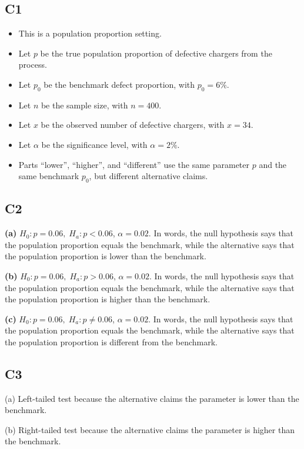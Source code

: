 \begin{ExamProblems}
		\subsection*{C1}
		\begin{itemize}
			\item This is a population proportion setting.
			\item Let \(p\) be the true population proportion of defective chargers from the process.
			\item Let \(p_0\) be the benchmark defect proportion, with \(p_0=6\%\).
			\item Let \(n\) be the sample size, with \(n=400\).
			\item Let \(x\) be the observed number of defective chargers, with \(x=34\).
			\item Let \(\alpha\) be the significance level, with \(\alpha=2\%\).
			\item Parts ``lower'', ``higher'', and ``different'' use the same parameter \(p\) and the same benchmark \(p_0\), but different alternative claims.
		\end{itemize}
		
		\subsection*{C2}
		\textbf{(a)} \(H_0\colon p=0.06,\; H_a\colon p<0.06\), \(\alpha=0.02\). In words, the null hypothesis says that the population proportion equals the benchmark, while the alternative says that the population proportion is lower than the benchmark.
		
		\textbf{(b)} \(H_0\colon p=0.06,\; H_a\colon p>0.06\), \(\alpha=0.02\). In words, the null hypothesis says that the population proportion equals the benchmark, while the alternative says that the population proportion is higher than the benchmark.
		
		\textbf{(c)} \(H_0\colon p=0.06,\; H_a\colon p\ne 0.06\), \(\alpha=0.02\). In words, the null hypothesis says that the population proportion equals the benchmark, while the alternative says that the population proportion is different from the benchmark.
		
		\subsection*{C3}
		(a) Left-tailed test because the alternative claims the parameter is lower than the benchmark.\LeftTailGraph
		
		(b) Right-tailed test because the alternative claims the parameter is higher than the benchmark.\RightTailGraph
		

\end{ExamProblems}
